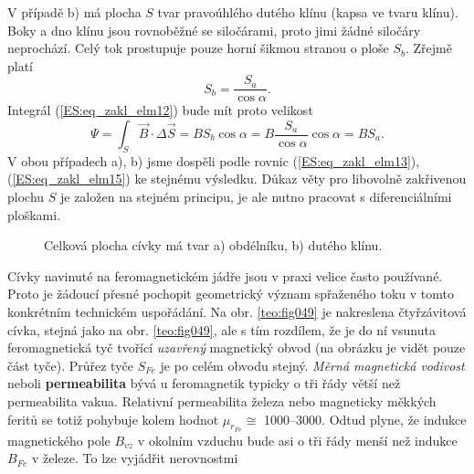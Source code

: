       V případě b) má plocha \(S\) tvar pravoúhlého dutého klínu (kapsa ve tvaru klínu). Boky a dno 
      klínu jsou rovnoběžné se siločárami, proto jimi žádné siločáry neprochází. Celý tok 
      prostupuje pouze horní šikmou stranou o ploše \(S_b\). Zřejmě platí
      \begin{equation}\label{ES:eq_zakl_elm14}
        S_b = \frac{S_a}{\cos\alpha}.
      \end{equation}
      Integrál (\ref{ES:eq_zakl_elm12}) bude mít proto velikost
      \begin{equation}\label{ES:eq_zakl_elm15}
        \Psi = \int_S\vec{B}\cdot\Delta \vec{S} = BS_b\cos\alpha 
             = B\frac{S_a}{\cos\alpha}\cos\alpha = BS_a.
      \end{equation}
      V obou případech a), b) jsme dospěli podle rovnic (\ref{ES:eq_zakl_elm13}), 
      (\ref{ES:eq_zakl_elm15}) ke stejnému výsledku. Důkaz věty pro libovolně zakřivenou plochu 
      \(S\) je založen na stejném principu, je ale nutno pracovat s diferenciálními ploškami.
      \begin{figure}[ht!]
        \centering  
        \caption{Celková plocha cívky má tvar a) obdélníku, b) dutého klínu. \cite[s.~16]{Patocka4}} 
        \label{teo:fig048}
      \end{figure}
      
      Cívky navinuté na feromagnetickém jádře jsou v praxi velice často používané. Proto je žádoucí
      přesné pochopit geometrický význam spřaženého toku v tomto konkrétním technickém uspořádání.
      Na obr. \ref{teo:fig049} je nakreslena čtyřzávitová cívka, stejná jako na obr.
      \ref{teo:fig049}, ale s tím rozdílem, že je do ní vsunuta feromagnetická tyč tvořící
      \emph{uzavřený} magnetický obvod (na obrázku je vidět pouze část tyče). Průřez tyče \(S_{Fe}\)
      je po celém obvodu stejný. \emph{Měrná magnetická vodivost} neboli \textbf{permeabilita} bývá
      u feromagnetik typicky o tři řády větší než permeabilita vakua. Relativní permeabilita železa
      nebo magneticky měkkých feritů se totiž pohybuje kolem hodnot \(\mu_{r_{Fe}}\cong\)
      \numrange{1000}{3000}. Odtud plyne, že indukce magnetického pole \(B_{vz}\) v okolním vzduchu
      bude asi o tři řády menší než indukce \(B_{Fe}\) v železe. To lze vyjádřit nerovnostmi

